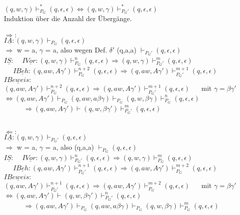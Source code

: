 \documentclass[11pt,a4paper]{article}
\begin{document}
$(q,w,\gamma) \vdash^*_{P_G} (q,\epsilon,\epsilon) \Leftrightarrow (q,w,\gamma) \vdash^*_{P_G'} (q,\epsilon,\epsilon) $ \\

Induktion über die Anzahl der Übergänge. \\
\\
$ \Rightarrow : $ \\
$ \underline{IA:} (q,w,\gamma) \vdash_{P_G} (q,\epsilon,\epsilon) $ \\
 $ \Rightarrow$ w = a, $\gamma$ = a, also wegen Def. $\delta'$ (q,a,a) $\vdash_{P_G'} (q,\epsilon,\epsilon) $ \\
$ \underline{IS:}$ ~ $\underline{IVor:} (q,w,\gamma) \vdash^n_{P_G} (q,\epsilon,\epsilon) \Rightarrow (q,w,\gamma) \vdash^m_{P_G'} (q,\epsilon,\epsilon) $ \\
~~ $ \underline{IBeh:} (q,aw,A\gamma') \vdash^{n+2}_{P_G} (q,\epsilon,\epsilon) \Rightarrow (q,aw,A\gamma') \vdash^{m+1}_{P_G'} (q,\epsilon,\epsilon) $ \\
$\underline{IBeweis:}$ \\
$ (q,aw,A\gamma') \vdash^{n+2}_{P_G} (q,\epsilon,\epsilon) \Rightarrow (q,aw,A\gamma') \vdash^{m+1}_{P_G'} (q,\epsilon,\epsilon) $ ~~ mit $\gamma = \beta\gamma'$ \\
$ \Leftrightarrow (q,aw,A\gamma') \vdash_{P_G} (q,aw,a\beta\gamma) \vdash_{P_G} (q,w,\beta\gamma) \vdash^n_{P_G} (q,\epsilon,\epsilon) $ \\
~~~~~ $ \Rightarrow (q,aw,A\gamma') \vdash (q,w,\beta\gamma') \vdash^m_{P_G'} (q,\epsilon,\epsilon) $ \\
\\

\newpage

$ \Leftarrow : $ \\
$ \underline{IA:} (q,w,\gamma) \vdash_{P_G'} (q,\epsilon,\epsilon) $ \\
$ \Rightarrow $ w = a, $\gamma$ = a, also (q,a,a) $\vdash_{P_G} (q,\epsilon,\epsilon) $ \\

$ \underline{IS:}$ ~ $\underline{IVor:} (q,w,\gamma) \vdash^n_{P_G'} (q,\epsilon,\epsilon) \Rightarrow (q,w,\gamma) \vdash^m_{P_G} (q,\epsilon,\epsilon) $ \\
~~ $ \underline{IBeh:} (q,aw,A\gamma') \vdash^{n+1}_{P_G'} (q,\epsilon,\epsilon) \Rightarrow (q,aw,A\gamma') \vdash^{m+2}_{P_G} (q,\epsilon,\epsilon) $ \\
$\underline{IBeweis:}$ \\
$ (q,aw,A\gamma') \vdash^{n+1}_{P_G'} (q,\epsilon,\epsilon) \Rightarrow (q,aw,A\gamma') \vdash^{m+2}_{P_G} (q,\epsilon,\epsilon) $ ~~ mit $\gamma = \beta\gamma'$ \\
$ \Leftrightarrow (q,aw,A\gamma') \vdash (q,w,\beta\gamma') \vdash^n_{P_G'} (q,\epsilon,\epsilon) $ \\
~~~~~ $ \Rightarrow (q,aw,A\gamma') \vdash_{P_G} (q,aw,a\beta\gamma) \vdash_{P_G} (q,w,\beta\gamma) \vdash^m_{P_G} (q,\epsilon,\epsilon) $ \\
\end{document}

